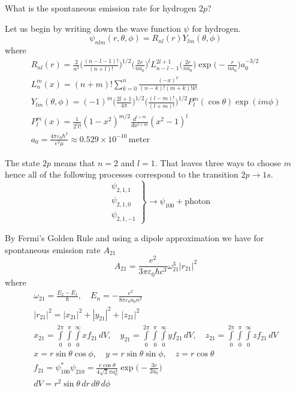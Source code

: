 \documentclass[12pt]{article}
\begin{document}
What is the spontaneous emission rate for hydrogen 2$p$?

\bigskip
Let us begin by writing down the wave function $\psi$ for hydrogen.
\begin{equation*}
\psi_{nlm}(r,\theta,\phi)=R_{nl}(r)Y_{lm}(\theta,\phi)
\end{equation*}
where
\begin{gather*}
R_{nl}(r)=
\frac{2}{n^2}
\bigg(\frac{(n-l-1)!}{(n+l)!}\bigg)^{1/2}
\bigg(\frac{2r}{na_0}\bigg)^l
L_{n-l-1}^{2l+1}\bigg(\frac{2r}{na_0}\bigg)
\exp\bigg(-\frac{r}{na_0}\bigg)
a_0^{-3/2}
\\
L_n^m(x)=(n+m)!\sum_{k=0}^n\frac{(-x)^k}{(n-k)!(m+k)!k!}
\\
Y_{lm}(\theta,\phi)=(-1)^m
\bigg(\frac{2l+1}{4\pi}\bigg)^{1/2}
\bigg(\frac{(l-m)!}{(l+m)!}\bigg)^{1/2}
P_l^m(\cos\theta)\exp(im\phi)
\\
P_l^m(x)=\frac{1}{2^l l!}(1-x^2)^{m/2}\frac{d^{l+m}}{dx^{l+m}}(x^2-1)^l
\\
a_0=\frac{4\pi\varepsilon_0\hbar^2}{e^2\mu}\approx0.529\times10^{-10}\,\text{meter}
\end{gather*}

The state $2p$ means that $n=2$ and $l=1$.
That leaves three ways to choose $m$ hence all of the following processes correspond to the transition
$2p\rightarrow1s$.
\begin{equation*}
\left.\begin{aligned}
&\psi_{2,1,1}
\\
&\psi_{2,1,0}
\\
&\psi_{2,1,-1}
\end{aligned}\right\}\rightarrow\psi_{100}+\text{photon}
\end{equation*}

By Fermi's Golden Rule and using a dipole approximation we have
for spontaneous emission rate $A_{21}$
\begin{equation*}
A_{21}=\frac{e^2}{3\pi\varepsilon_0\hbar c^3}\omega_{21}^3|r_{21}|^2
\tag{1}
\end{equation*}
where
\begin{gather*}
\omega_{21}=\frac{E_2-E_1}{\hbar},\quad E_n=-\frac{e^2}{8\pi\varepsilon_0a_0n^2}
\\
|r_{21}|^2=|x_{21}|^2+|y_{21}|^2+|z_{21}|^2
\\
x_{21}=\int\limits_{0}^{2\pi}\int\limits_{0}^{\pi}\int\limits_{0}^{\infty}xf_{21}\,dV,
\quad
y_{21}=\int\limits_{0}^{2\pi}\int\limits_{0}^{\pi}\int\limits_{0}^{\infty}yf_{21}\,dV,
\quad
z_{21}=\int\limits_{0}^{2\pi}\int\limits_{0}^{\pi}\int\limits_{0}^{\infty}zf_{21}\,dV
\\
x=r\sin\theta\cos\phi,
\quad
y=r\sin\theta\sin\phi,
\quad
z=r\cos\theta
\\
f_{21}=\psi_{100}^*\psi_{210}=\frac{r\cos\theta}{4\sqrt2\pi a_0^4}\exp\bigg({-}\frac{3r}{2a_0}\bigg)
\\
dV=r^2\sin\theta\,dr\,d\theta\,d\phi
\end{gather*}
\end{document}

